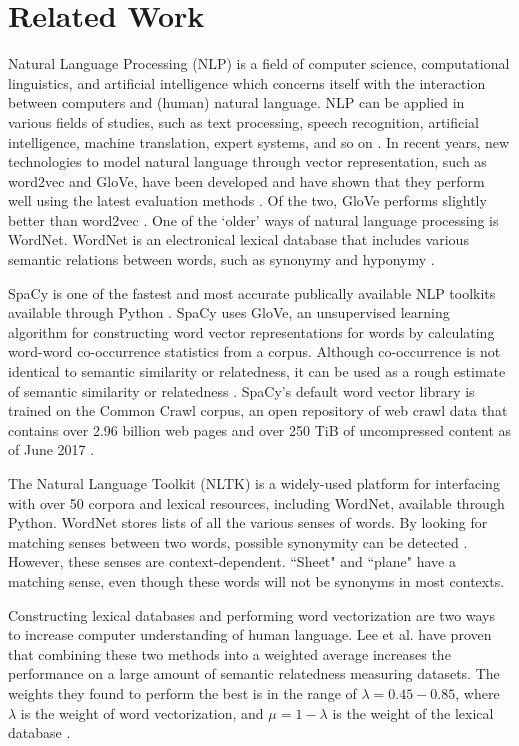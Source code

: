 \documentclass{article}
\begin{document}
\section{Related Work} \label{sec:relwork}

Natural Language Processing (NLP) is a field of computer science, computational linguistics, and artificial intelligence which concerns itself with the interaction between computers and (human) natural language. NLP can be applied in various fields of studies, such as text processing, speech recognition, artificial intelligence, machine translation, expert systems, and so on \citep{chowdhury2003natural}. 
In recent years, new technologies to model natural language through vector representation, such as word2vec and GloVe, have been developed \citep{mikolov2013efficient, pennington2014glove} and have shown that they perform well using the latest evaluation methods \citep{schnabel2015evaluation}. Of the two, GloVe performs slightly better than word2vec \citep{lee2016combining}.
One of the `older' ways of natural language processing is WordNet. WordNet is an electronical lexical database that includes various semantic relations between words, such as synonymy and hyponymy \citep{kilgarriff2000wordnet}.

SpaCy is one of the fastest and most accurate publically available NLP toolkits available through Python \citep{choi2015depends}. SpaCy uses GloVe, an unsupervised learning algorithm for constructing word vector representations for words by calculating word-word co-occurrence statistics from a corpus. Although co-occurrence is not identical to semantic similarity or relatedness, it can be used as a rough estimate of semantic similarity or relatedness \citep{levy2015improving}. SpaCy's default word vector library is trained on the Common Crawl corpus, an open repository of web crawl data that contains over 2.96 billion web pages and over 250 TiB of uncompressed content as of June 2017 \citep{nagel2017commoncrawl}.

The Natural Language Toolkit (NLTK) is a widely-used platform for interfacing with over 50 corpora and lexical resources, including WordNet, available through Python. WordNet stores lists of all the various senses of words. By looking for matching senses between two words, possible synonymity can be detected \cite{kilgarriff2000wordnet}. However, these senses are context-dependent. ``Sheet" and ``plane" have a matching sense, even though these words will not be synonyms in most contexts.

Constructing lexical databases and performing word vectorization are two ways to increase computer understanding of human language. Lee et al. have proven that combining these two methods into a weighted average increases the performance on a large amount of semantic relatedness measuring datasets. The weights they found to perform the best is in the range of $\lambda = 0.45-0.85$, where $\lambda$ is the weight of word vectorization, and $\mu = 1-\lambda$ is the weight of the lexical database \cite{lee2016combining}.
\end{document}
